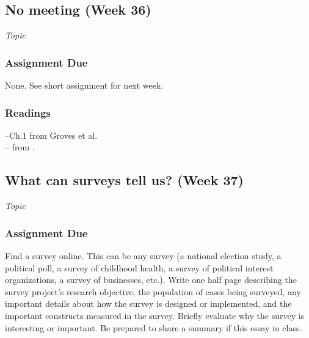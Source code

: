 \documentclass[12pt,a4paper]{article}
\newcommand{\reading}[2][]{\noindent --{#1} from \bibentry{#2}.\vspace{.25em}\\}
\newcommand{\textbook}[2][]{\noindent --{#1} from Groves et al.\vspace{.25em}\\} %
\newcommand{\seealso}{\noindent \emph{See Also:}\\}
\begin{document}
\secttoc

\clearpage





\subsection{No meeting (Week 36)}
\emph{Topic}
\vspace{1em}

\subsubsection*{Assignment Due}
None. See short assignment for next week.

\subsubsection*{Readings}
\textbook[Ch.1]{}
\reading{Brady2000} %




\clearpage
\subsection{What can surveys tell us? (Week 37)}
\emph{Topic}


\vspace{1em}
\subsubsection*{Assignment Due}
Find a survey online. This can be any survey (a national election study, a political poll, a survey of childhood health, a survey of political interest organizations, a survey of businesses, etc.). Write one half page describing the survey project's research objective, the population of cases being surveyed, any important details about how the survey is designed or implemented, and the important constructs measured in the survey. Briefly evaluate why the survey is interesting or important. Be prepared to share a summary if this essay in class.
\end{document}
